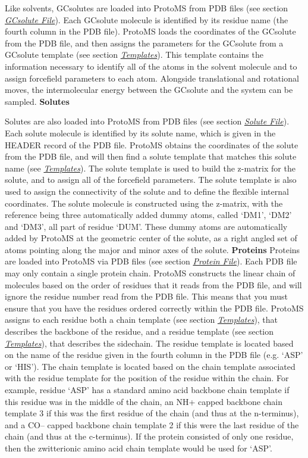 \documentclass[letterpaper,10pt,english]{manual}
\begin{document}
Like solvents, GCsolutes are loaded into ProtoMS from PDB files (see section \hyperlink{gcpdb}{\emph{GCsolute File}}). Each GCsolute molecule is identified by its residue name (the fourth column in the PDB file). ProtoMS loads the coordinates of the GCsolute from the PDB file, and then assigns the parameters for the GCsolute from a GCsolute template (see section \hyperlink{temref}{\emph{Templates}}). This template contains the information necessary to identify all of the atoms in the solvent molecule and to assign forcefield parameters to each atom. Alongside translational and rotational moves, the intermolecular energy between the GCsolute and the system can be sampled.
\textbf{Solutes}

Solutes are also loaded into ProtoMS from PDB files (see section \hyperlink{solpdb}{\emph{Solute File}}). Each solute molecule is identified by its solute name, which is given in the HEADER record of the PDB file. ProtoMS obtains the coordinates of the solute from the PDB file, and will then find a solute template that matches this solute name (see \hyperlink{temref}{\emph{Templates}}). The solute template is used to build the z-matrix for the solute, and to assign all of the forcefield parameters. The solute template is also used to assign the connectivity of the solute and to define the flexible internal coordinates. The solute molecule is constructed using the z-matrix, with the reference being three automatically added dummy atoms, called ‘DM1’, ‘DM2’ and ‘DM3’, all part of residue ‘DUM’. These dummy atoms are automatically added by ProtoMS at the geometric center of the solute, as a right angled set of atoms pointing along the major and minor axes of the solute.
\textbf{Proteins}
Proteins are loaded into ProtoMS via PDB files (see section \hyperlink{protpdb}{\emph{Protein File}}). Each PDB file may only contain a single protein chain. ProtoMS constructs the linear chain of molecules based on the order of residues that it reads from the PDB file, and will ignore the residue number read from the PDB file. This means that you must ensure that you have the residues ordered correctly within the PDB file. ProtoMS assigns to each residue both a chain template (see section \hyperlink{temref}{\emph{Templates}}), that describes the backbone of the residue, and a residue template (see section \hyperlink{temref}{\emph{Templates}}), that describes the sidechain. The residue template is located based on the name of the residue given in the fourth column in the PDB file (e.g. ‘ASP’ or ‘HIS’). The chain template is located based on the chain template associated with the residue template for the position of the residue within the chain. For example, residue ‘ASP’ has a standard amino acid backbone chain template if this residue was in the middle of the chain, an NH+ capped backbone chain template 3 if this was the first residue of the chain (and thus at the n-terminus), and a CO-- capped backbone chain template 2 if this were the last residue of the chain (and thus at the c-terminus). If the protein consisted of only one residue, then the zwitterionic amino acid chain template would be used for ‘ASP’.
\end{document}
